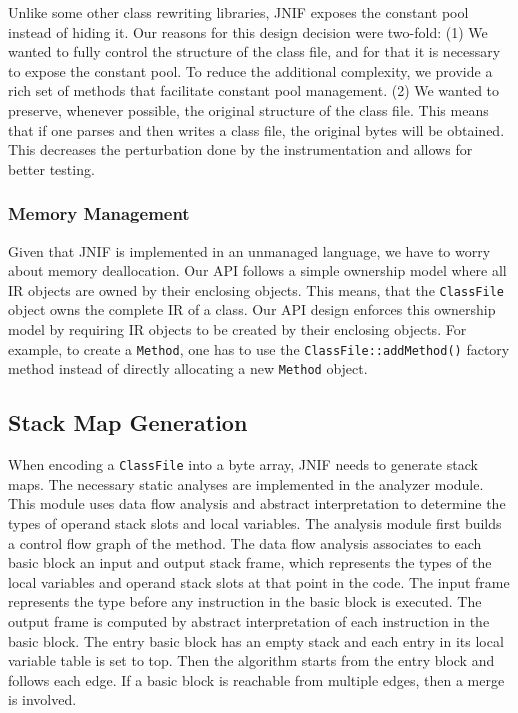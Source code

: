 Unlike some other class rewriting libraries, JNIF exposes the constant pool instead of hiding it.
Our reasons for this design decision were two-fold:
(1) We wanted to fully control the structure of the class file, 
and for that it is necessary to expose the constant pool. 
To reduce the additional complexity, we provide a rich set of methods that facilitate constant pool management. 
(2) We wanted to preserve, whenever possible, the original structure of the class file. 
This means that if one parses and then writes a class file, 
the original bytes will be obtained. 
This decreases the perturbation done by the instrumentation and allows for better testing.


\subsubsection*{Memory Management}

Given that JNIF is implemented in an unmanaged language,
we have to worry about memory deallocation.
Our API follows a simple ownership model
where all IR objects are owned by their enclosing objects.
This means, that the \texttt{ClassFile} object owns the complete IR of a class.
Our API design enforces this ownership model
by requiring IR objects to be created by their enclosing objects.
For example, to create a \texttt{Method}, 
one has to use the \texttt{ClassFile::addMethod()} factory method
instead of directly allocating a new \texttt{Method} object.


\subsection{Stack Map Generation}

When encoding a \texttt{ClassFile} into a byte array, JNIF needs to generate stack maps.
The necessary static analyses are implemented in the analyzer module.
This module uses data flow analysis and abstract interpretation to determine the types of operand stack slots and local variables.
The analysis module first builds a control flow graph of the method.
The data flow analysis associates to each basic block an input and output stack frame, 
which represents the types of the local variables and operand stack slots at that point in the code.
The input frame represents the type before any instruction in the basic block is executed.
The output frame is computed by abstract interpretation of each instruction in the basic block.
The entry basic block has an empty stack and each entry in its local variable table is set to top.
Then the algorithm starts from the entry block and follows each edge.
If a basic block is reachable from multiple edges, then a merge is involved.

